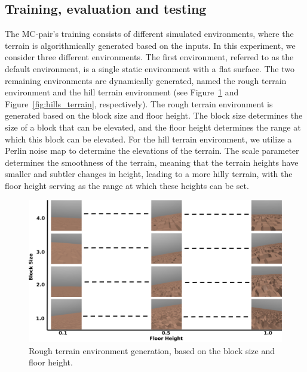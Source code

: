     \subsection{Training, evaluation and testing}
        The MC-pair's training consists of different simulated environments, where the terrain is algorithmically generated based on the inputs. In this experiment, we consider three different environments. The first environment, referred to as the default environment, is a single static environment with a flat surface. The two remaining environments are dynamically generated, named the rough terrain environment and the hill terrain environment (see Figure~\ref{fig:rough_terrain} and Figure~\ref{fig:hills_terrain}, respectively). The rough terrain environment is generated based on the block size and floor height. The block size determines the size of a block that can be elevated, and the floor height determines the range at which this block can be elevated. For the hill terrain environment, we utilize a Perlin noise map to determine the elevations of the terrain. The scale parameter determines the smoothness of the terrain, meaning that the terrain heights have smaller and subtler changes in height, leading to a more hilly terrain, with the floor height serving as the range at which these heights can be set. 
        \begin{figure}[ht]
            \centering
            \includegraphics[width=\linewidth]{./resources/rough_terrain.png}
            \caption{Rough terrain environment generation, based on the block size and floor height.}
            \label{fig:rough_terrain}
        \end{figure}
